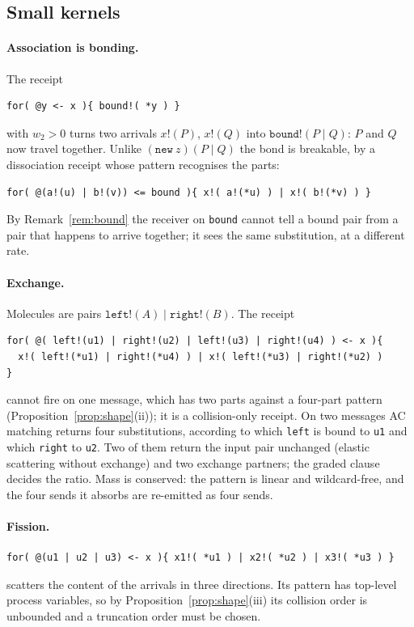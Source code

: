 \documentclass[11pt,a4paper]{article}
\theoremstyle{plain}
\theoremstyle{definition}
\theoremstyle{remark}
\newcommand{\code}[1]{\texttt{#1}}
\begin{document}
\subsection{Small kernels}\label{ssec:association}

\paragraph{Association is bonding.}
The receipt
\begin{lstlisting}
for( @y <- x ){ bound!( *y ) }
\end{lstlisting}
with $w_2>0$ turns two arrivals $x!(P)$, $x!(Q)$ into $\code{bound}!(P\mid Q)$:
$P$ and $Q$ now travel together. Unlike $(\code{new}\ z)(P\mid Q)$ the bond is
breakable, by a dissociation receipt whose pattern recognises the parts:
\begin{lstlisting}
for( @(a!(u) | b!(v)) <= bound ){ x!( a!(*u) ) | x!( b!(*v) ) }
\end{lstlisting}
By Remark~\ref{rem:bound} the receiver on \code{bound} cannot tell a bound pair
from a pair that happens to arrive together; it sees the same substitution, at a
different rate.

\paragraph{Exchange.}
Molecules are pairs $\code{left}!(A)\mid\code{right}!(B)$. The receipt
\begin{lstlisting}
for( @( left!(u1) | right!(u2) | left!(u3) | right!(u4) ) <- x ){
  x!( left!(*u1) | right!(*u4) ) | x!( left!(*u3) | right!(*u2) )
}
\end{lstlisting}
cannot fire on one message, which has two parts against a four-part pattern
(Proposition~\ref{prop:shape}(ii)); it is a collision-only receipt. On two
messages AC matching returns four substitutions, according to which
\code{left} is bound to \code{u1} and which \code{right} to \code{u2}. Two of
them return the input pair unchanged (elastic scattering without exchange) and
two exchange partners; the graded clause decides the ratio. Mass is conserved:
the pattern is linear and wildcard-free, and the four sends it absorbs are
re-emitted as four sends.

\paragraph{Fission.}
\begin{lstlisting}
for( @(u1 | u2 | u3) <- x ){ x1!( *u1 ) | x2!( *u2 ) | x3!( *u3 ) }
\end{lstlisting}
scatters the content of the arrivals in three directions. Its pattern has
top-level process variables, so by Proposition~\ref{prop:shape}(iii) its
collision order is unbounded and a truncation order must be chosen.
\end{document}

